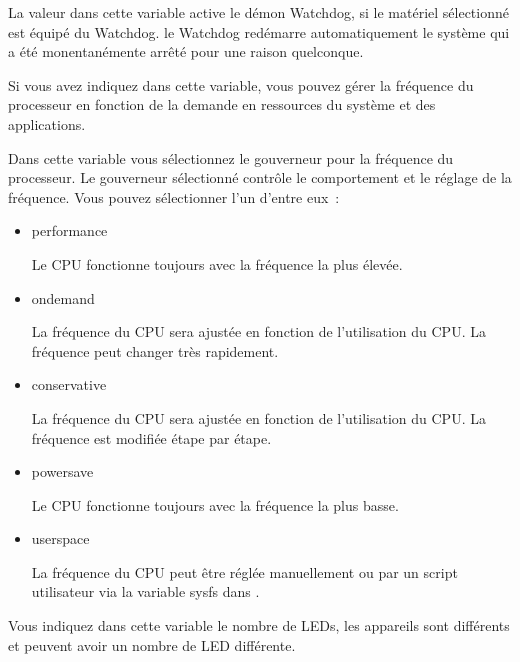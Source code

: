 \begin{description}

  La valeur  dans cette variable active le démon Watchdog, si
  le matériel sélectionné est équipé du Watchdog. le Watchdog redémarre
  automatiquement le système qui a été monentanémente arrêté pour une
  raison quelconque.


  Si vous avez indiquez  dans cette variable, vous pouvez gérer la fréquence
  du processeur en fonction de la demande en ressources du système et des applications.


  Dans cette variable vous sélectionnez le gouverneur pour la fréquence du processeur.
  Le gouverneur sélectionné contrôle le comportement et le réglage de la fréquence.
  Vous pouvez sélectionner l'un d'entre eux~:

  \begin{itemize}
    \item performance

      Le CPU fonctionne toujours avec la fréquence la plus élevée.

    \item ondemand

      La fréquence du CPU sera ajustée en fonction de l'utilisation du CPU.
      La fréquence peut changer très rapidement.

    \item conservative

      La fréquence du CPU sera ajustée en fonction de l'utilisation du CPU.
      La fréquence est modifiée étape par étape.

    \item powersave

      Le CPU fonctionne toujours avec la fréquence la plus basse.

    \item userspace

      La fréquence du CPU peut être réglée manuellement ou par un script utilisateur via 
      la variable sysfs dans .
  \end{itemize}


  Vous indiquez dans cette variable le nombre de LEDs, les appareils sont
  différents et peuvent avoir un nombre de LED différente.


\end{description}
